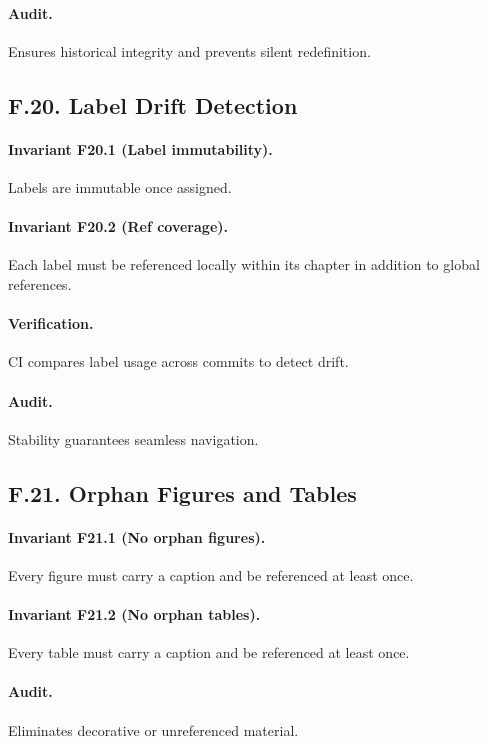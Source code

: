 \paragraph{Audit.}
Ensures historical integrity and prevents silent redefinition.

\subsection*{F.20. Label Drift Detection}

\paragraph{Invariant F20.1 (Label immutability).}
Labels are immutable once assigned.

\paragraph{Invariant F20.2 (Ref coverage).}
Each label must be referenced locally within its chapter in addition to
global references.

\paragraph{Verification.}
CI compares label usage across commits to detect drift.

\paragraph{Audit.}
Stability guarantees seamless navigation.

\subsection*{F.21. Orphan Figures and Tables}

\paragraph{Invariant F21.1 (No orphan figures).}
Every figure must carry a caption and be referenced at least once.

\paragraph{Invariant F21.2 (No orphan tables).}
Every table must carry a caption and be referenced at least once.

\paragraph{Audit.}
Eliminates decorative or unreferenced material.

